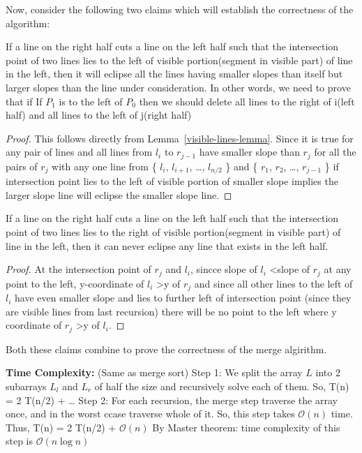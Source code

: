 \documentclass[11pt]{article}
\renewcommand{\O}{\mathcal{O}}
\begin{document}
Now, consider the following two claims which will establish the correctness of the algorithm: \newline

 If a line on the right half cuts a line on the left half such that the intersection point of two lines
lies to the left of visible portion(segment in visible part) of line in the left, then it will eclipse all the lines 
having smaller slopes than itself but larger slopes than the line under consideration. \newline
In other words, we need to prove that if If $P_1$ is to the left of $P_0$ then we should delete all lines
to the right of i(left half) and all lines to the left of j(right half)

\begin{proof}
This follows directly from Lemma~\ref{visible-lines-lemma}. Since it is true for any pair of lines
and all lines from $l_i$ to $r_{j-1}$ have smaller slope than $r_j$ \newline
for all the pairs of 
$r_j$ with any one line from \{ $l_i$, $l_{i+1}$, \dots , $l_{n/2}$ \} and \{ $r_1$, $r_2$, \dots, $r_{j-1}$ \}
if intersection point lies to the left of visible portion of smaller slope implies the larger slope line will
eclipse the smaller slope line.
\end{proof}

 If a line on the right half cuts a line on the left half such that the intersection point of two lines
lies to the right of visible portion(segment in visible part) of line in the left, then it can never eclipse any line that 
exists in the left half. \newline
\begin{proof}
At the intersection point of $r_j$ and $l_i$, sincce slope of $l_i$ \textless slope of $r_j$
at any point to the left, y-coordinate of $l_i$ \textgreater y of $r_j$ \newline
and since all other lines to the left of $l_i$ have even smaller slope 
and lies to further left of intersection point (since they are visible lines from last recursion) \newline
there will be no point to the left where y coordinate of $r_j$ \textgreater y of $l_i$. 
\end{proof}

Both  these claims combine to prove the correctness of the merge algirithm. \newline

{\bf Time Complexity:} (Same as merge sort) \newline
Step 1: We split the array $L$ into 2 subarrays $L_l$ and $L_r$ of half the size and recursively solve each of them. 
So, T(n) = 2 T(n/2) + \dots \newline
Step 2: For each recursion, the merge step traverse the array once, and in the worst ccase traverse whole of it. \newline
So, this step takes $\O(n)$ time. \newline
Thus, T(n) = 2 T(n/2) + $\O(n)$ \newline
By Master theorem: time complexity of this step is $\O(n\log n)$ \newline
\end{document}
